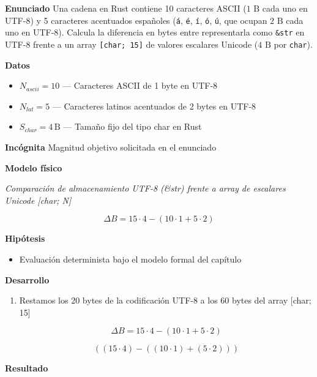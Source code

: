 \documentclass{book}
\begin{document}
\begin{tcolorbox}[title={Problema resuelto}, studiumworked, breakable]

\noindent\textbf{Enunciado}
Una cadena en Rust contiene 10 caracteres ASCII (\(1\text{ B}\) cada uno en UTF-8) y 5 caracteres acentuados españoles (\texttt{{\'a}}, \texttt{{\'e}}, \texttt{{\'i}}, \texttt{{\'o}}, \texttt{{\'u}}, que ocupan \(2\text{ B}\) cada uno en UTF-8). Calcula la diferencia en bytes entre representarla como \texttt{\&str} en UTF-8 frente a un array \texttt{[char; 15]} de valores escalares Unicode (\(4\text{ B}\) por \texttt{char}).

\noindent\textbf{Datos}
\begin{itemize}
\item $N_{ascii} = 10$ — Caracteres ASCII de 1 byte en UTF-8
\item $N_{lat} = 5$ — Caracteres latinos acentuados de 2 bytes en UTF-8
\item $S_{char} = 4\,\mathrm{B}$ — Tamaño fijo del tipo char en Rust
\end{itemize}

\noindent\textbf{Incógnita}
Magnitud objetivo solicitada en el enunciado

\noindent\textbf{Modelo físico}

\noindent\textit{Comparación de almacenamiento UTF-8 (\&str) frente a array de escalares Unicode [char; N]}

\[
\Delta B = 15 \cdot 4 - (10 \cdot 1 + 5 \cdot 2)
\]

\noindent\textbf{Hipótesis}
\begin{itemize}
\item Evaluación determinista bajo el modelo formal del capítulo
\end{itemize}

\noindent\textbf{Desarrollo}
\begin{enumerate}
\item
Restamos los 20 bytes de la codificación UTF-8 a los 60 bytes del array [char; 15]

\[
\Delta B = 15 \cdot 4 - (10 \cdot 1 + 5 \cdot 2)
\]

\[
\left(\left(15\cdot 4\right)-\left(\left(10\cdot 1\right)+\left(5\cdot 2\right)\right)\right)
\]
\end{enumerate}

\noindent\textbf{Resultado}


\end{tcolorbox}
\end{document}
